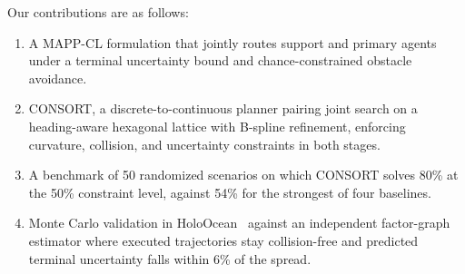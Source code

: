 \documentclass[letterpaper, 10 pt, conference]{ieeeconf}
\theoremstyle{remark}
\begin{document}
Our contributions are as follows:
\begin{enumerate}
  \item A MAPP-CL formulation that jointly routes support and primary agents under a terminal uncertainty bound and chance-constrained obstacle avoidance.
  \item CONSORT, a discrete-to-continuous planner pairing joint search on a heading-aware hexagonal lattice with B-spline refinement, enforcing curvature, collision, and uncertainty constraints in both stages.
  \item A benchmark of 50 randomized scenarios on which CONSORT solves 80\% at the 50\% constraint level, against 54\% for the strongest of four baselines.
  \item Monte Carlo validation in HoloOcean~\cite{potokar2024holoocean} against an independent factor-graph estimator where executed trajectories stay collision-free and predicted terminal uncertainty falls within 6\% of the spread.
\end{enumerate}
\end{document}
